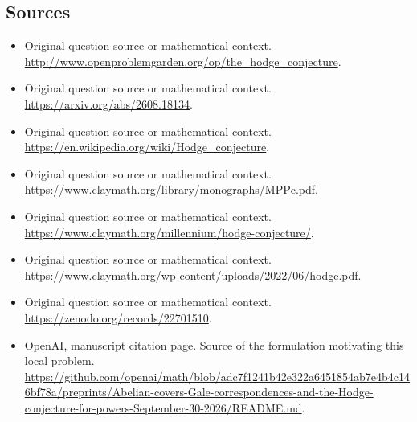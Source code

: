\documentclass[11pt]{article}
\begin{document}
\subsection{Sources}
\begin{itemize}
\item[S1] Original question source or mathematical context.
\url{http://www.openproblemgarden.org/op/the_hodge_conjecture}.
\item[S2] Original question source or mathematical context.
\url{https://arxiv.org/abs/2608.18134}.
\item[S3] Original question source or mathematical context.
\url{https://en.wikipedia.org/wiki/Hodge_conjecture}.
\item[S4] Original question source or mathematical context.
\url{https://www.claymath.org/library/monographs/MPPc.pdf}.
\item[S5] Original question source or mathematical context.
\url{https://www.claymath.org/millennium/hodge-conjecture/}.
\item[S6] Original question source or mathematical context.
\url{https://www.claymath.org/wp-content/uploads/2022/06/hodge.pdf}.
\item[S7] Original question source or mathematical context.
\url{https://zenodo.org/records/22701510}.
\item[S8] OpenAI, manuscript citation page. Source of the formulation motivating this local problem.
\url{https://github.com/openai/math/blob/adc7f1241b42e322a6451854ab7e4b4c146bf78a/preprints/Abelian-covers-Gale-correspondences-and-the-Hodge-conjecture-for-powers-September-30-2026/README.md}.
\end{itemize}
\end{document}
